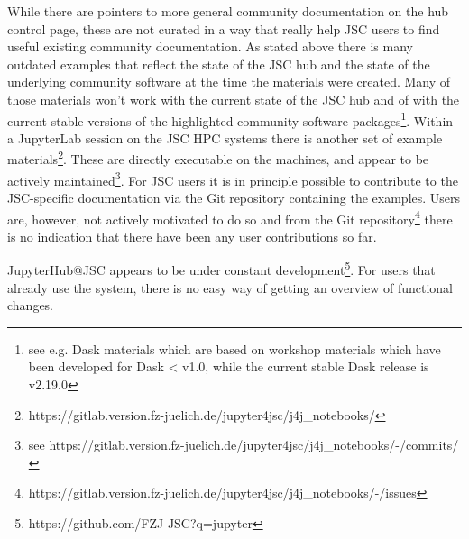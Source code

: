 While there are pointers to more general community documentation on the hub control page, these are not curated in a way that really help JSC users to find useful existing community documentation.
As stated above there is many outdated examples that reflect the state of the JSC hub and the state of the underlying community software at the time the materials were created.
Many of those materials won't work with the current state of the JSC hub and of with the current stable versions of the highlighted community software packages\footnote{see e.g. Dask materials which are based on workshop materials which have been developed for Dask < v1.0, while the current stable Dask release is v2.19.0}.
Within a JupyterLab session on the JSC HPC systems there is another set of example materials\footnote{https://gitlab.version.fz-juelich.de/jupyter4jsc/j4j_notebooks/}.
These are directly executable on the machines, and appear to be actively maintained\footnote{see https://gitlab.version.fz-juelich.de/jupyter4jsc/j4j_notebooks/-/commits/}.
For JSC users it is in principle possible to contribute to the JSC-specific documentation via the Git repository containing the examples.
Users are, however, not actively motivated to do so and from the Git repository\footnote{https://gitlab.version.fz-juelich.de/jupyter4jsc/j4j_notebooks/-/issues} there is no indication that there have been any user contributions so far.

JupyterHub@JSC appears to be under constant development\footnote{https://github.com/FZJ-JSC?q=jupyter}.
For users that already use the system, there is no easy way of getting an overview of functional changes.

